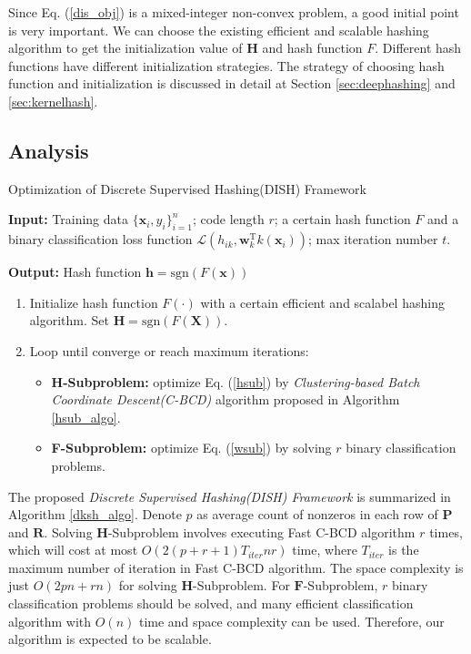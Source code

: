 \documentclass[conference]{IEEEtran}
\begin{document}
Since Eq. (\ref{dis_obj}) is a mixed-integer non-convex problem, a good initial point is very important. We can choose the existing efficient and scalable hashing algorithm to get the initialization value of $\mathbf{H}$ and hash function $F$. Different hash functions have different initialization strategies. The strategy of choosing hash function and initialization is discussed in detail at Section \ref{sec:deephashing} and \ref{sec:kernelhash}.

\subsection{Analysis}

\begin{algorithm}[t]
\small
\caption{Optimization of Discrete Supervised Hashing(DISH) Framework}
\textbf{Input:} Training data $\{ \mathbf{x}_i, y_i \}_{i=1}^n$; code length $r$; a certain hash function $F$ and a binary classification loss function $\mathcal{L} (h_{ik}, \mathbf{w}_k^\mathrm{T} k(\mathbf{x}_i))$; max iteration number $t$.

\textbf{Output:} Hash function $\mathbf{h}=\mathrm{sgn}(F(\mathbf{x}))$

\begin{enumerate}
    \item Initialize hash function $F(\cdot)$ with a certain efficient and scalabel hashing algorithm. Set $\mathbf{H}=\mathrm{sgn} (F(\mathbf{X}))$.
    \item Loop until converge or reach maximum iterations:
    \begin{itemize}
        \item \textbf{H-Subproblem:} optimize Eq. (\ref{hsub}) by {\em Clustering-based Batch Coordinate Descent(C-BCD)} algorithm proposed in Algorithm \ref{hsub_algo}.
        \item \textbf{F-Subproblem:} optimize Eq. (\ref{wsub}) by solving $r$ binary classification problems.
    \end{itemize}
\end{enumerate}
\label{dksh_algo}
\end{algorithm}

The proposed {\em Discrete Supervised Hashing(DISH) Framework} is summarized in Algorithm \ref{dksh_algo}. Denote $p$ as average count of nonzeros in each row of $\mathbf{P}$ and $\mathbf{R}$. Solving $\mathbf{H}$-Subproblem involves executing Fast C-BCD algorithm $r$ times, which will cost at most $O(2(p+r+1)T_{iter}nr)$ time, where $T_{iter}$ is the maximum number of iteration in Fast C-BCD algorithm. The space complexity is just $O(2pn+rn)$ for solving $\mathbf{H}$-Subproblem. For $\mathbf{F}$-Subproblem, $r$ binary classification problems should be solved, and many efficient classification algorithm with $O(n)$ time and space complexity can be used. Therefore, our algorithm is expected to be scalable.
\end{document}
